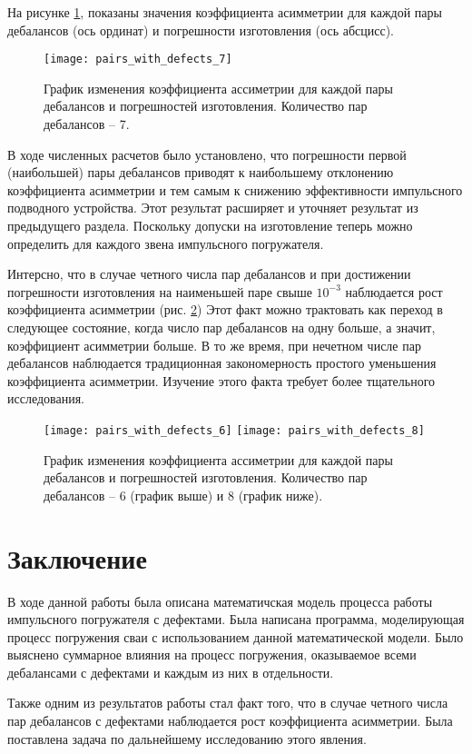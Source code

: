 На рисунке \ref{fig:pairs_with_defects_7}, показаны значения коэффициента асимметрии для каждой
пары дебалансов (ось ординат) и погрешности изготовления (ось абсцисс).

\begin{figure}[ht]
    \centering
    \texttt{[image: pairs\_with\_defects\_7]}
    \caption{График изменения коэффициента ассиметрии для каждой пары дебалансов и погрешностей изготовления.
    Количество пар дебалансов -- 7.}
    \label{fig:pairs_with_defects_7}
\end{figure}

В ходе численных расчетов было установлено, что погрешности первой (наибольшей) пары дебалансов приводят к наибольшему отклонению коэффициента
асимметрии и тем самым к снижению эффективности импульсного подводного устройства. Этот результат расширяет и уточняет результат из предыдущего раздела.
Поскольку допуски на изготовление теперь можно определить для каждого звена импульсного погружателя.

Интерсно, что в случае четного числа пар дебалансов и при достижении погрешности изготовления на наименьшей паре свыше $10^{-3}$ наблюдается рост
коэффициента асимметрии (рис. \ref{fig:pairs_with_defects_even}) Этот факт можно трактовать как переход в следующее состояние,
когда число пар дебалансов на одну больше, а значит, коэффициент асимметрии больше. В то же время, при нечетном числе пар дебалансов
наблюдается традиционная закономерность простого уменьшения коэффициента асимметрии.
Изучение этого факта требует более тщательного исследования.

\begin{figure}[ht]
    \centering
    \texttt{[image: pairs\_with\_defects\_6]}
    \texttt{[image: pairs\_with\_defects\_8]}
    \caption{График изменения коэффициента ассиметрии для каждой пары дебалансов и погрешностей изготовления.
    Количество пар дебалансов -- 6 (график выше) и 8 (график ниже).}
    \label{fig:pairs_with_defects_even}
\end{figure}

\clearpage

\section*{Заключение}

В ходе данной работы была описана математичская модель процесса работы импульсного погружателя с дефектами. Была
написана программа, моделирующая процесс погружения сваи с использованием данной математической модели. Было выяснено
суммарное влияния на процесс погружения, оказываемое всеми дебалансами с дефектами и каждым из них в отдельности.

Также одним из результатов работы стал факт того, что в случае четного числа пар дебалансов с дефектами наблюдается
рост коэффициента асимметрии. Была поставлена задача по дальнейшему исследованию этого явления.

\clearpage


\nocite{*}

\printbibliography{}